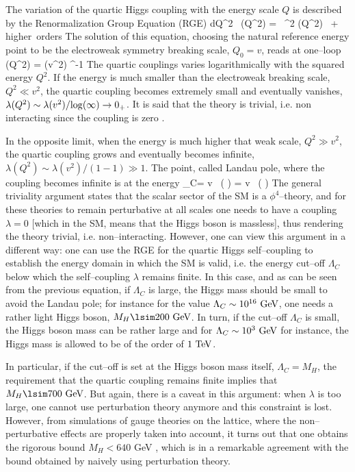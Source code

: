 The variation of the quartic Higgs coupling with the energy scale $Q$ is 
described by the Renormalization Group Equation (RGE) \cite{RGE-Lambda}
\beq
{} { {\rm d}Q^2 }\, \lambda (Q^2) =  \, \lambda^2 
(Q^2) \ + {\rm higher~orders}  
\eeq
The solution of this equation, choosing the natural reference energy point to 
be the electroweak symmetry breaking scale, $Q_0=v$, reads at one--loop
\beq
\lambda (Q^2) = \lambda (v^2) ^{-1}  
\eeq
The quartic couplings varies logarithmically with the squared energy $Q^2$. 
If the energy is much smaller than the electroweak breaking scale, $Q^2 
\ll v^2$, the quartic coupling becomes extremely small and eventually vanishes,
$\lambda (Q^2) \sim  \lambda (v^2) /{\rm log}(\infty)  \to 0_+$. 
It is said that the theory is trivial, i.e. non interacting since the coupling 
is zero \cite{Triviality-term}. \s

In the opposite limit,  when the energy is much higher that weak scale,  
$Q^2 \gg v^2$, the quartic coupling grows and eventually becomes infinite,
$\lambda (Q^2) \sim \lambda (v^2)/ (1- 1)\gg 1$. The point, called Landau pole, 
where the coupling becomes infinite is at the energy 
\beq
\Lambda_C= v \, \exp \left (  \right) 
= v \, \exp \left (  \right)
\eeq
The general triviality argument \cite{TRIVIALITY,WL-lattice} states that 
the scalar sector of the SM is a $\phi^4$--theory, and for these theories to 
remain perturbative at all scales one needs to have a coupling $\lambda=0$ 
[which in the SM, means that the Higgs boson is massless], thus rendering the 
theory trivial, i.e. non--interacting. However,
one can view this argument in a different way:  one can use the RGE for the
quartic Higgs self--coupling to establish the energy domain in which the SM is
valid, i.e.  the energy  cut--off $\Lambda_C$ below which the self--coupling
$\lambda$ remains finite. In this case, and as can be seen from the previous 
equation, if $\Lambda_C$ is large, the Higgs mass should be small to avoid the 
Landau pole; for instance for the value $\Lambda_C \sim 10^{16}~{\rm GeV}$, 
one needs a rather light Higgs boson, $M_H \lsim 200~{\rm GeV}$. 
In turn, if the cut--off $\Lambda_C$ is small, the Higgs boson mass can
be  rather large and for $\Lambda_C \sim 10^{3}~{\rm GeV}$ for instance, the 
Higgs mass is allowed to be of the order of  $1~{\rm TeV}$.\s

In particular, if the cut--off is set at the Higgs boson mass itself,
$\Lambda_C = M_H$,  the requirement that the quartic coupling remains finite
implies that  $M_H \lsim  700~{\rm GeV}$. But again, there is a caveat in this
argument: when $\lambda$ is too large, one cannot use perturbation theory
anymore and this constraint is lost. However, from simulations of gauge
theories on the lattice, where the non--perturbative effects  are properly
taken into account, it turns out that one obtains the rigorous  bound $M_H <
640$ GeV \cite{LATTICE}, which is in a remarkable agreement with the bound
obtained by naively using perturbation  theory.  

